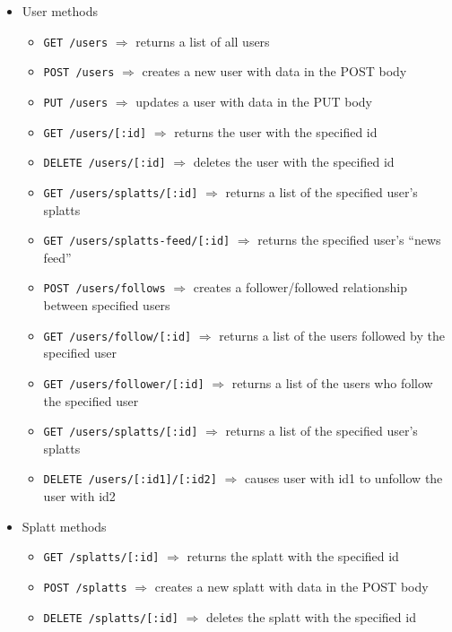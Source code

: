 \documentclass{article}
\begin{document}
\begin{itemize}
 \item User methods
  \begin{itemize}
    \item \texttt{GET /users}  $\Rightarrow$ returns a list of all users
    \item \texttt{POST /users}  $\Rightarrow$ creates a new user with data in the POST body
    \item \texttt{PUT /users}  $\Rightarrow$ updates a user with data in the PUT body
    \item \texttt{GET /users/[:id]} $\Rightarrow$ returns the user with the specified id
    \item \texttt{DELETE /users/[:id]} $\Rightarrow$ deletes the user with the specified id
    \item \texttt{GET /users/splatts/[:id]}  $\Rightarrow$ returns a list of the specified user's splatts
    \item \texttt{GET /users/splatts-feed/[:id]}  $\Rightarrow$ returns the specified user's ``news feed''
    \item \texttt{POST /users/follows}  $\Rightarrow$ creates a follower/followed relationship between specified users
    \item \texttt{GET /users/follow/[:id]}  $\Rightarrow$ returns a list of the users followed by the specified user
    \item \texttt{GET /users/follower/[:id]}  $\Rightarrow$ returns a list of the users who follow the specified user
    \item \texttt{GET /users/splatts/[:id]}  $\Rightarrow$ returns a list of the specified user's splatts
    \item \texttt{DELETE /users/[:id1]/[:id2]} $\Rightarrow$ causes user with id1 to unfollow the user with id2

  \end{itemize}

 \item Splatt methods
  \begin{itemize}
    
    \item \texttt{GET /splatts/[:id]} $\Rightarrow$ returns the splatt with the specified id
    \item \texttt{POST /splatts}  $\Rightarrow$ creates a new splatt with data in the POST body
    \item \texttt{DELETE /splatts/[:id]} $\Rightarrow$ deletes the splatt with the specified id
  \end{itemize}
\end{itemize}
\end{document}
